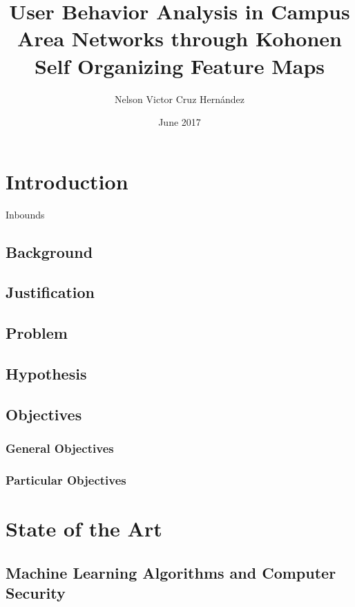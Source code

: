 \documentclass{article}
\title{User Behavior Analysis in Campus Area Networks through Kohonen Self Organizing Feature Maps}
\author{Nelson Victor Cruz Hern\'andez }
\date{June 2017}
\begin{document}
\maketitle






\section{Introduction} %
Inbounds

\subsection{Background} %

\subsection{Justification} %

\subsection{Problem} %

\subsection{Hypothesis} %

\subsection{Objectives} %

\subsubsection{General Objectives} %

\subsubsection{Particular Objectives} %







\section{State of the Art} %

\subsection{Machine Learning Algorithms and Computer Security} %
\end{document}
